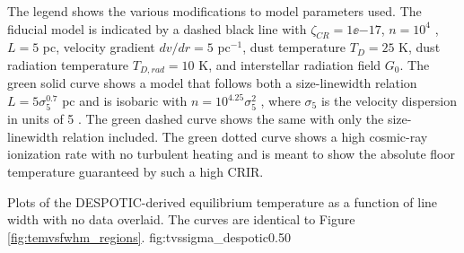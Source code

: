 The legend shows the various modifications to model parameters used.  The
fiducial model is indicated by a dashed black line with $\zeta_{CR} =
1\ee{-17}$, $n=10^4$ \percc, $L=5$ pc, velocity gradient $dv/dr=5$ \kms
pc$^{-1}$, dust temperature $T_D=25$ K, dust radiation temperature $T_{D,rad} =
10$ K, and interstellar radiation field $G_0$.  The green solid curve shows a
model that follows both a size-linewidth relation $L=5 \sigma_5^{0.7}$ pc and
is isobaric with $n=10^{4.25} \sigma_5^2$ \percc, where $\sigma_5$ is the
velocity dispersion in units of 5 \kms.  The green dashed curve shows the same
with only the size-linewidth relation included.  The green dotted curve shows a
high cosmic-ray ionization rate with no turbulent heating and is meant to show
the absolute floor temperature guaranteed by such a high CRIR.


{Plots of the DESPOTIC-derived equilibrium temperature as a function of line
width with no data overlaid.  The curves are identical to Figure
\ref{fig:temvsfwhm_regions}.}
{fig:tvssigma_despotic}{0.5}{0}




